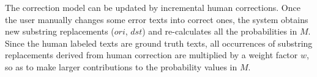 The correction model can be updated by incremental human corrections.
Once the user manually changes some error texts into correct ones,
the system obtains new substring replacements ($ori$, $dst$)
and re-calculates all the probabilities in $M$.
Since the human labeled texts are ground truth texts,
all occurrences of substring replacements derived from human correction
are multiplied by a weight factor $w$,
so as to make larger contributions to the probability values in $M$.




%
%
%
%
%
%
%
%
